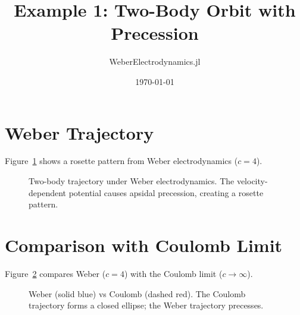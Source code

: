 \documentclass[11pt]{article}
\title{Example 1: Two-Body Orbit with Precession}
\author{WeberElectrodynamics.jl}
\date{\today}
\begin{document}
\maketitle

\section{Weber Trajectory}

Figure~\ref{fig:trajectory} shows a rosette pattern from Weber electrodynamics ($c = 4$).

\begin{figure}[htbp]
    \centering
    
    \caption{Two-body trajectory under Weber electrodynamics. The velocity-dependent potential causes apsidal precession, creating a rosette pattern.}
    \label{fig:trajectory}
\end{figure}

\section{Comparison with Coulomb Limit}

Figure~\ref{fig:comparison} compares Weber ($c = 4$) with the Coulomb limit ($c \to \infty$).

\begin{figure}[htbp]
    \centering
    
    \caption{Weber (solid blue) vs Coulomb (dashed red). The Coulomb trajectory forms a closed ellipse; the Weber trajectory precesses.}
    \label{fig:comparison}
\end{figure}
\end{document}
